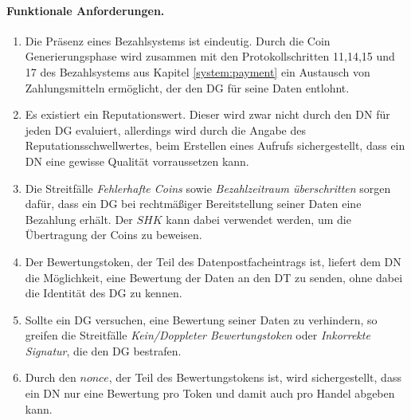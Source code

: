\documentclass[
	fontsize=11pt,
	headings=small,
	parskip=half,           %
	bibliography=totoc,
	numbers=noenddot,       %
	open=any,               %
]{scrreprt}
\begin{document}
\paragraph{Funktionale Anforderungen.}
\begin{enumerate}
    \item Die Präsenz eines Bezahlsystems ist eindeutig. Durch die Coin Generierungsphase wird zusammen mit den Protokollschritten 11,14,15 und 17 des Bezahlsystems aus Kapitel \ref{system:payment} ein Austausch von Zahlungsmitteln ermöglicht, der den DG für seine Daten entlohnt.
    \item Es existiert ein Reputationswert. Dieser wird zwar nicht durch den DN für jeden DG evaluiert, allerdings wird durch die Angabe des Reputationsschwellwertes, beim Erstellen eines Aufrufs sichergestellt, dass ein DN eine gewisse Qualität vorraussetzen kann.
    \item Die Streitfälle \textit{Fehlerhafte Coins} sowie \textit{Bezahlzeitraum überschritten} sorgen dafür, dass ein DG bei rechtmäßiger Bereitstellung seiner Daten eine Bezahlung erhält. Der $SHK$ kann dabei verwendet werden, um die Übertragung der Coins zu beweisen.
    \item Der Bewertungstoken, der Teil des Datenpostfacheintrags ist, liefert dem DN die Möglichkeit, eine Bewertung der Daten an den DT zu senden, ohne dabei die Identität des DG zu kennen.
    \item Sollte ein DG versuchen, eine Bewertung seiner Daten zu verhindern, so greifen die Streitfälle \textit{Kein/Doppleter Bewertungstoken} oder \textit{Inkorrekte Signatur}, die den DG bestrafen.
    \item Durch den $nonce$, der Teil des Bewertungstokens ist, wird sichergestellt, dass ein DN nur eine Bewertung pro Token und damit auch pro Handel abgeben kann.
\end{enumerate} 
\end{document}
